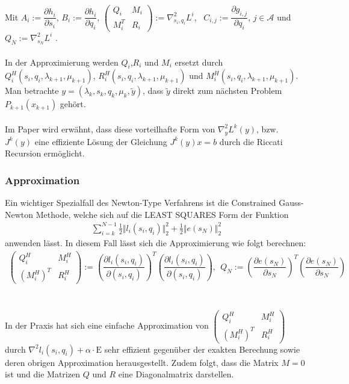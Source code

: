   \\
  Mit $ A_i := \dfrac{\partial h_i}{\partial s_i} $, 
  $ B_i := \dfrac{\partial h_i}{\partial q_i} $,
  $
  \begin{pmatrix}
  Q_i & M_i \\
  M_i^{T} & R_i
  \end{pmatrix} := \nabla_{s_i,q_i}^{2}L^{i} $, \
  $C_{i, j} := \dfrac{\partial g_{i, j}}{\partial q_i}$, $j \in \mathscr{A}$
  und 
  $ Q_N := \nabla_{s_N}^{2}L^{i} $ .\\
  \\
  In der Approximierung werden $ Q_i $,$ R_i $ und $ M_i $ ersetzt durch $ Q_i^{H}(s_i,q_i,\lambda_{k+1}, \mu_{k+1}) $, $R_i^{H}(s_i,q_i,\lambda_{k+1}, \mu_{k+1}) $ und $ M_i^{H}(s_i,q_i,\lambda_{k+1}, \mu_{k+1}) $.\\
  Man betrachte  $ y = (\lambda_k, s_k,q_k, \mu_{k}, \tilde{y}) $, dass $\tilde{y}$ direkt zum nächsten Problem $ P_{k+1}(x_{k+1})$ gehört. \\
  \\
  Im Paper \cite{Diehl2002} wird erwähnt, dass diese vorteilhafte Form von $\nabla_{y}^{2} L^{k}(y) $, bzw. $ J^{k}(y) $ eine effiziente Lösung der Gleichung $ J^{k}(y)x = b $ durch die Riccati Recursion ermöglicht.\\

  \subsubsection{Approximation}\label{subsub:Approx}
  Ein wichtiger Spezialfall des Newton-Type Verfahrens ist die Constrained Gauss-Newton Methode, welche sich auf die LEAST SQUARES Form der Funktion
  \begin{align}
  \sum_{i = k}^{N-1}\frac{1}{2}\Vert l_i (s_i , q_i )\Vert_{2}^{2} +\frac{1}{2}\Vert e (s_N )\Vert_{2}^{2}
  \end{align}
  anwenden lässt. In diesem Fall lässt sich die Approximierung wie folgt berechnen:
  \begin{align}
  \begin{pmatrix}
  Q_i^{H} & M_i^{H} \\
  (M_i^{H})^{T} & R_i^{H}
  \end{pmatrix} :=
  \left( 
  \dfrac{\partial l_i (s_i,q_i)}{\partial (s_i,q_i)}
  \right) ^{T}
  \left( 
  \dfrac{\partial l_i (s_i,q_i)}{\partial (s_i,q_i)}
  \right)
  , \ \ 
  Q_N :=
  \left( 
  \dfrac{\partial e (s_N)}{\partial s_N}
  \right) ^{T}
  \left( 
  \dfrac{\partial e (s_N)}{\partial s_N}
  \right)
  \end{align}\\
  \\
  In der Praxis hat sich eine einfache Approximation von 
  $
  \begin{pmatrix}
  Q_i^{H} & M_i^{H} \\
  (M_i^{H})^{T} & R_i^{H}
  \end{pmatrix} 
  $
  durch 
$\nabla^2 l_i(s_i, q_i) + \alpha \cdot \mathrm{E}$ sehr effizient gegenüber der exakten Berechung sowie deren obrigen Approximation herausgestellt. Zudem folgt, dass die Matrix $M = 0$ ist und die Matrizen $Q$ und $R$ eine Diagonalmatrix darstellen.
